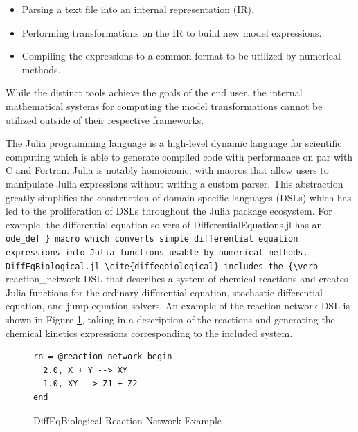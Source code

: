 \documentclass{juliacon}
\begin{document}
\begin{itemize}
    \item Parsing a text file into an internal representation (IR).
    \item Performing transformations on the IR to build new model expressions.
    \item Compiling the expressions to a common format to be utilized by numerical methods.
\end{itemize}

While the distinct tools achieve the goals of the end user, the internal mathematical systems for computing the model transformations cannot be utilized outside of their respective frameworks.

The Julia programming language \cite{bezanson_julia:_2017} is a high-level dynamic language for scientific computing which is able to generate compiled code with performance on par with C and Fortran. Julia is notably homoiconic, with macros that allow users to manipulate Julia expressions without writing a custom parser. This abstraction greatly simplifies the construction of domain-specific languages (DSLs) which has led to the proliferation of DSLs throughout the Julia package ecosystem. For example, the differential equation solvers of DifferentialEquations.jl \cite{christopher_rackauckas_differentialequations.jl_2017} has an {\verb @ode_def } macro which converts simple differential equation expressions into Julia functions usable by numerical methods. DiffEqBiological.jl \cite{diffeqbiological} includes the {\verb @reaction_network } DSL that describes a system of chemical reactions and creates Julia functions for the ordinary differential equation, stochastic differential equation, and jump equation solvers. An example of the reaction network DSL is shown in Figure \ref{code:reaction}, taking in a description of the reactions and generating the chemical kinetics expressions corresponding to the included system.

\begin{figure}
\begin{subfigure}%
\begin{lstlisting}
rn = @reaction_network begin
  2.0, X + Y --> XY               
  1.0, XY --> Z1 + Z2            
end
\end{lstlisting}
\end{subfigure}
\quad
\begin{subfigure}%
\begin{align*}
\begin{split}
    \frac{d[X]}{dt} &= -2 [X] [Y]\\
    \frac{d[Y]}{dt} &= -2 [X] [Y]\\
    \frac{d[XY]}{dt} &= 2 [X] [Y] - [XY]\\
    \frac{d[Z1]}{dt} &= [XY]\\
    \frac{d[Z2]}{dt} &= [XY]
\end{split}
\end{align*}
\end{subfigure}
\caption{DiffEqBiological Reaction Network Example}
\label{code:reaction}
\end{figure}
\end{document}
